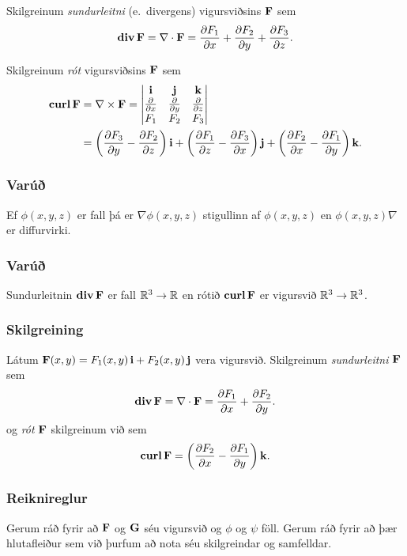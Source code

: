Skilgreinum {\em sundurleitni} (e.~divergens) vigursviðsins $\mbox{${\bf F}$}$ sem 
 $$\mbox{${\rm\bf div\,}$}\mbox{${\bf F}$}=\nabla\cdot\mbox{${\bf F}$}=\frac{\partial F_1}{\partial x}+\frac{\partial F_2}{\partial y}+\frac{\partial F_3}{\partial z}.$$

Skilgreinum {\em rót}  vigursviðsins $\mbox{${\bf F}$}$ sem 
 \begin{align*}
 \mbox{${\rm\bf curl\,}$}\mbox{${\bf F}$}&=\nabla\times\mbox{${\bf F}$} =\begin{vmatrix} \mbox{${\bf i}$}&\mbox{${\bf j}$}&\mbox{${\bf k}$}\\
 \frac{\partial} {\partial x}&\frac{\partial}{\partial y}&\frac{\partial}{\partial z}\\F_1&F_2&F_3\end{vmatrix} \\ &=\bigg(\frac{\partial F_3}{\partial y}-\frac{\partial F_2}{\partial z}\bigg)\,\mbox{${\bf i}$}+\bigg(\frac{\partial F_1}{\partial z}-\frac{\partial F_3}{\partial x}\bigg)\,\mbox{${\bf j}$}+\bigg(\frac{\partial F_2}{\partial x}-\frac{\partial F_1}{\partial y}\bigg)\,\mbox{${\bf k}$}. 
 \end{align*}



\subsubsection{Varúð \rtask{}}
  Ef $\phi(x,y,z)$ er fall þá er $\nabla \phi(x,y,z)$ 
stigullinn af $\phi(x,y,z)$ en $\phi(x,y,z)\nabla$ er diffurvirki.



\subsubsection{Varúð \rtask{}}
 Sundurleitnin $\mbox{${\rm\bf div\,}$}\mbox{${\bf F}$}$ er fall ${\mathbb R}^3\rightarrow{\mathbb R}$ en rótið $\mbox{${\rm\bf curl\,}$}\mbox{${\bf F}$}$ er vigursvið ${\mathbb R}^3\rightarrow{\mathbb R}^3$.



\subsubsection{Skilgreining \rtask{}}
 Látum
$\mbox{${\bf F}$}(x,y)=F_1(x,y)\,\mbox{${\bf i}$}+F_2(x,y)\,\mbox{${\bf j}$}$ vera vigursvið.  Skilgreinum
{\em sundurleitni} $\mbox{${\bf F}$}$ sem  
$$\mbox{${\rm\bf div\,}$}\mbox{${\bf F}$}=\nabla\cdot\mbox{${\bf F}$}=\frac{\partial F_1}{\partial
  x}+\frac{\partial F_2}{\partial y}.$$ 
og {\em rót} $\mbox{${\bf F}$}$ skilgreinum við sem 
$$\mbox{${\rm\bf curl\,}$}\mbox{${\bf F}$}=\bigg(\frac{\partial F_2}{\partial x}-\frac{\partial
  F_1}{\partial y}\bigg)\,\mbox{${\bf k}$}.$$ 




\subsubsection{Reiknireglur \rtask{}}
  Gerum ráð fyrir að $\mbox{${\bf F}$}$ og $\mbox{${\bf G}$}$ séu
vigursvið og $\phi$ og $\psi$ föll.  Gerum ráð fyrir að þær
hlutafleiður sem við þurfum að nota séu skilgreindar og samfelldar. 


